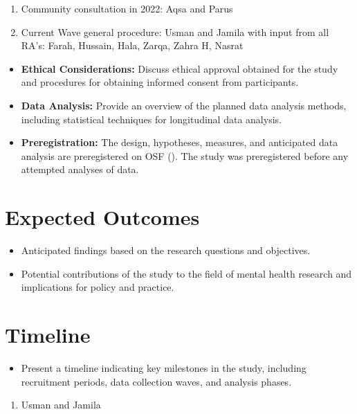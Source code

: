 \documentclass[
  man,
  longtable,
  nolmodern,
  notxfonts,
  notimes,
  colorlinks=true,linkcolor=blue,citecolor=blue,urlcolor=blue]{apa7}
\providecommand{\tightlist}{%
  \setlength{\itemsep}{0pt}\setlength{\parskip}{0pt}}
\begin{document}
\begin{enumerate}
\def\labelenumi{\arabic{enumi}.}
\tightlist
\item
  Community consultation in 2022: Aqsa and Parus
\item
  Current Wave general procedure: Usman and Jamila with input from all
  RA's: Farah, Hussain, Hala, Zarqa, Zahra H, Nasrat
\end{enumerate}

\begin{itemize}
\tightlist
\item
  \textbf{Ethical Considerations:} Discuss ethical approval obtained for
  the study and procedures for obtaining informed consent from
  participants.
\item
  \textbf{Data Analysis:} Provide an overview of the planned data
  analysis methods, including statistical techniques for longitudinal
  data analysis.
\item
  \textbf{Preregistration:} The design, hypotheses, measures, and
  anticipated data analysis are preregistered on OSF (). The study was
  preregistered before any attempted analyses of data.
\end{itemize}

\section{Expected Outcomes}\label{expected-outcomes}

\begin{itemize}
\tightlist
\item
  Anticipated findings based on the research questions and objectives.
\item
  Potential contributions of the study to the field of mental health
  research and implications for policy and practice.
\end{itemize}

\section{Timeline}\label{timeline}

\begin{itemize}
\tightlist
\item
  Present a timeline indicating key milestones in the study, including
  recruitment periods, data collection waves, and analysis phases.
\end{itemize}

\begin{enumerate}
\def\labelenumi{\arabic{enumi}.}
\tightlist
\item
  Usman and Jamila
\end{enumerate}
\end{document}
